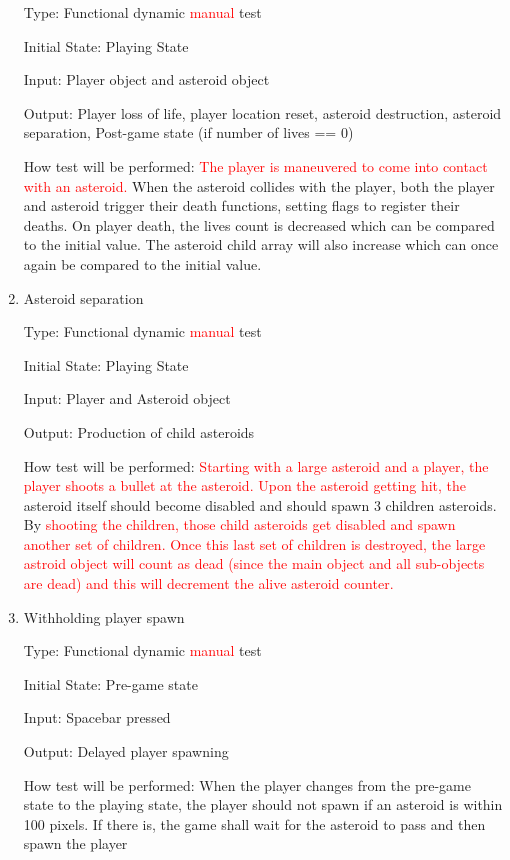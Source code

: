\documentclass[12pt, titlepage]{article}
\begin{document}
\begin{enumerate}
Type: Functional dynamic \textcolor{red}{manual} test

Initial State: Playing State

Input: Player object and asteroid object

Output: Player loss of life, player location reset, asteroid destruction, asteroid separation, Post-game state (if number of lives == 0)

How test will be performed: \textcolor{red}{The player is maneuvered to come into contact with an asteroid.} When the asteroid collides with the player, both the player and asteroid trigger their death functions, setting flags to register their deaths. On player death, the lives count is decreased which can be compared to the initial value. The asteroid child array will also increase which can once again be compared to the initial value.

\item{Asteroid separation\\}

Type: Functional dynamic \textcolor{red}{manual} test

Initial State: Playing State

Input: Player and Asteroid object

Output: Production of child asteroids

How test will be performed: \textcolor{red}{Starting with a large asteroid and a player, the player shoots a bullet at the asteroid. Upon the asteroid getting hit, the} asteroid itself should become disabled and should spawn 3 children asteroids. By \textcolor{red}{shooting the children, those child asteroids get disabled and spawn another set of children. Once this last set of children is destroyed, the large astroid object will count as dead (since the main object and all sub-objects are dead) and this will decrement the alive asteroid counter.}

\item{Withholding player spawn\\}

Type: Functional dynamic \textcolor{red}{manual} test

Initial State: Pre-game state

Input: Spacebar pressed

Output: Delayed player spawning

How test will be performed: When the player changes from the pre-game state to the playing state, the player should not spawn if an asteroid is within 100 pixels. If there is, the game shall wait for the asteroid to pass and then spawn the player

\end{enumerate}
\end{document}
